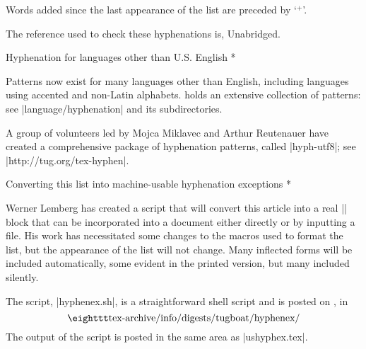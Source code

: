 Words added since the last appearance of the list are preceded by `${}^+$'.

The reference used to check these hyphenations is, Unabridged.

%

\head * Hyphenation for languages \break other than U.S. English *

Patterns now exist for many languages other than  English,
including languages using accented and non-Latin alphabets.
{\CTAN} holds an extensive collection of patterns: see
|language/hyphenation| and its subdirectories.

A group of volunteers led by Mojca Miklavec and Arthur Reutenauer
have created a comprehensive package of hyphenation patterns, called
|hyph-utf8|; see |http://tug.org/tex-hyphen|.

\head * Converting this list into machine-usable \break hyphenation exceptions *

Werner Lemberg has created a script that will convert this article into
a real |\hyphenation| block that can be incorporated into a document
either directly or by inputting a file.  His work has necessitated
some changes to the macros used to format the list, but the appearance
of the list will not change.  Many inflected forms will be included
automatically, some evident in the printed version, but many included
silently.

The script, |hyphenex.sh|, is a straightforward shell script and is
posted on \CTAN, in
$$\hbox{\tt tex-archive/info/digests/tugboat/hyphenex/}$$
The output of the script is posted in the same area as |ushyphex.tex|.



\def\printhyphens#1{%
 \setbox0\vbox{%
  \pretolerance-1\hyphenpenalty-10000%
  \hsize0pt\leftskip0pt\rightskip0pt\parfillskip0pt%
  \hbadness100\hfuzz\maxdimen
  \offinterlineskip
  \interlinepenalty0\clubpenalty0\widowpenalty0\brokenpenalty0%
  \noindent\hskip0pt #1\par
  \setbox0\lastbox \global\setbox1\hbox{\hbox{\unhbox0}}%
  \loop \unskip \setbox0\lastbox \ifhbox0%
   \global\setbox1\hbox{\hbox{\unhbox0}\discretionary{}{}{}\unhbox1}%
  \repeat}%
}

